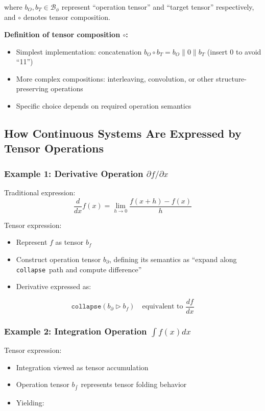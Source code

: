 \documentclass[12pt,a4paper]{article}
\theoremstyle{plain}
\theoremstyle{definition}
\theoremstyle{remark}
\newcommand{\collapse}{\texttt{collapse}}
\newcommand{\Bphi}{\mathcal{B}_\phi}
\begin{document}
where $b_O, b_T \in \Bphi$ represent ``operation tensor'' and ``target tensor'' respectively, and $\circ$ denotes tensor composition.

\textbf{Definition of tensor composition $\circ$:}
\begin{itemize}
\item Simplest implementation: concatenation $b_O \circ b_T = b_O \| 0 \| b_T$ (insert 0 to avoid ``11'')
\item More complex compositions: interleaving, convolution, or other structure-preserving operations
\item Specific choice depends on required operation semantics
\end{itemize}

\subsection{How Continuous Systems Are Expressed by Tensor Operations}

\subsubsection{Example 1: Derivative Operation $\partial f/\partial x$}

Traditional expression:
\begin{equation}
\frac{d}{dx} f(x) = \lim_{h \to 0} \frac{f(x+h) - f(x)}{h}
\end{equation}

Tensor expression:
\begin{itemize}
\item Represent $f$ as tensor $b_f$
\item Construct operation tensor $b_{\partial}$, defining its semantics as ``expand along \collapse\ path and compute difference''
\item Derivative expressed as:
\end{itemize}

\begin{equation}
\boxed{
\collapse(b_{\partial} \triangleright b_f)
}
\quad \text{equivalent to } \frac{df}{dx}
\end{equation}

\subsubsection{Example 2: Integration Operation $\int f(x) dx$}

Tensor expression:
\begin{itemize}
\item Integration viewed as tensor accumulation
\item Operation tensor $b_{\int}$ represents tensor folding behavior
\item Yielding:
\end{itemize}
\end{document}
